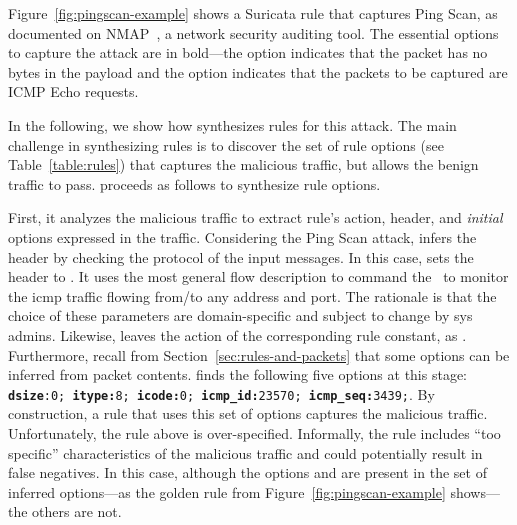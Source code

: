 \documentclass[conference]{IEEEtran}
\begin{document}
Figure~\ref{fig:pingscan-example} shows a Suricata rule that captures
Ping Scan, as documented on NMAP~\cite{netmap}, a network security
auditing tool. The essential options to capture the attack are in
bold---the option  indicates that the packet has no
bytes in the payload and the option  indicates that
the packets to be captured are ICMP Echo requests.


In the following, we show how \tname{} synthesizes rules for this
attack. The main challenge in synthesizing rules is to discover the
set of rule options (see Table~\ref{table:rules}) that captures the
malicious traffic, but allows the benign traffic to pass. \tname{}
proceeds as follows to synthesize rule options.


First, it analyzes the malicious traffic to extract rule's action,
header, and \emph{initial} options expressed in the
traffic. Considering the Ping Scan attack, \tname{} 
infers the header by checking the protocol of the input messages. In
this case, \tname{} sets the header to . It uses the most general flow description to command the
\nids\ to monitor the icmp traffic flowing from/to any address and
port.  The rationale is that the choice of these parameters are
domain-specific and subject to change by sys admins. Likewise,
\tname{} leaves the action of the corresponding rule constant, as
. Furthermore, recall from
Section~\ref{sec:rules-and-packets} that some options can be inferred
from packet contents. \tname{} finds the following five options at
this stage: {\scriptsize{\texttt{\textbf{dsize}:0; \textbf{itype:}8;
      \textbf{icode:}0; \textbf{icmp\_id:}23570;
      \textbf{icmp\_seq:}3439;}}}.  By construction, a rule that uses
this set of options captures the malicious traffic. Unfortunately, the
rule above is over-specified. Informally, the rule includes ``too
specific'' characteristics of the malicious traffic and could
potentially result in false negatives. In this case, although the
options  and  are present in the set
of inferred options---as the golden rule from
Figure~\ref{fig:pingscan-example} shows---the others are not.
\end{document}
